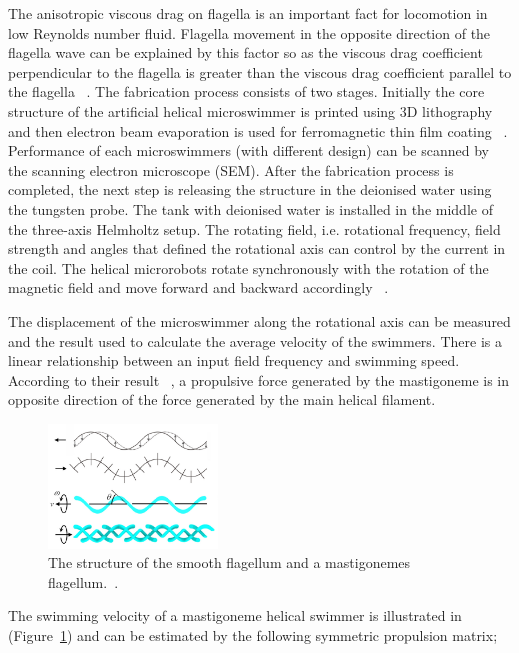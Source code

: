 \documentclass[a4paper,11pt]{article}
\begin{document}
\begin{sloppypar}
The anisotropic viscous drag on flagella is an important fact for locomotion in low Reynolds number fluid. 
Flagella movement in the opposite direction of the flagella wave can be explained by this factor so as the 
viscous drag coefficient perpendicular to the flagella is greater than the viscous drag coefficient parallel to 
the flagella ~\citep{tottori2013artificial}. 
The fabrication process consists of two stages. Initially the core structure of the artificial helical 
microswimmer is printed using 3D lithography and then electron beam evaporation is used for 
ferromagnetic thin film coating ~\citep{tottori2013artificial}.  
Performance of each microswimmers (with different design) can be scanned by the scanning electron
 microscope (SEM). After the fabrication process is completed, the next step is releasing the structure in 
the deionised water using the tungsten probe. The tank with deionised water is installed in the middle of the 
three-axis Helmholtz setup.  The rotating field, i.e. rotational frequency, field strength and angles that 
defined the rotational axis can control by the current in the coil. The helical microrobots rotate 
synchronously with the rotation of the magnetic field and move forward and backward accordingly ~\citep{tottori2013artificial}. 

The displacement of the microswimmer along the rotational axis can be measured and the result 
used to calculate the average velocity of the swimmers. There is a linear relationship between an input 
field frequency and swimming speed. According to their result ~\citep{tottori2013artificial}, a propulsive force generated by 
the mastigoneme is in opposite direction of the force generated by the main helical filament. 


\begin{figure}
  \centering
    \includegraphics[width=0.4\textwidth]{10}
  \caption{ The structure of the smooth flagellum and a mastigonemes flagellum.~\citep{gao2013bioinspired}.}
  \label{10}
\end{figure}



The swimming velocity of a mastigoneme helical swimmer is illustrated in  (Figure~\ref{10}) and can be estimated by the following
 symmetric propulsion matrix;



\end{sloppypar}
\end{document}
